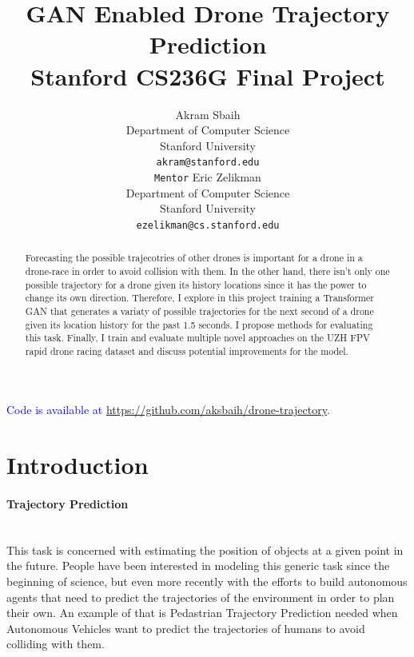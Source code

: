 \documentclass{article}
\title{
  GAN Enabled Drone Trajectory Prediction \\
  \vspace{1em}
  \small{\normalfont Stanford CS236G Final Project} 
}
\author{
  Akram Sbaih \\
  Department of Computer Science \\
  Stanford University \\
  \texttt{akram@stanford.edu} \\
     \And
   \texttt{Mentor} Eric Zelikman \\
   Department of Computer Science \\
   Stanford University \\
   \texttt{ezelikman@cs.stanford.edu} \\
}
\newcommand{\note}[1]{\textcolor{blue}{{#1}}}
\begin{document}
\maketitle

 \begin{abstract}
 Forecasting the possible trajecotries of other drones is important for a drone in a drone-race in order to avoid collision with them. In the other hand, there isn't only one possible trajectory for a drone given its history locations since it has the power to change its own direction. Therefore, I explore in this project training a Transformer GAN that generates a variaty of possible trajectories for the next second of a drone given its location history for the past 1.5 seconds.  I propose methods for evaluating this task. Finally, I train and evaluate multiple novel approaches on the UZH FPV rapid drone racing dataset and discuss potential improvements for the model.
 \end{abstract}



\note{Code is available at \href{https://github.com/aksbaih/drone-trajectory}{https://github.com/aksbaih/drone-trajectory}.}

\section{Introduction}
\paragraph{Trajectory Prediction}$ $
\\This task is concerned with estimating the position of objects at a given point in the future. People have been interested in modeling this generic task since the beginning of science, but even more recently with the efforts to build autonomous agents that need to predict the trajectories of the environment in order to plan their own. An example of that is Pedastrian Trajectory Prediction needed when Autonomous Vehicles want to predict the trajectories of humans to avoid colliding with them. 
\end{document}
